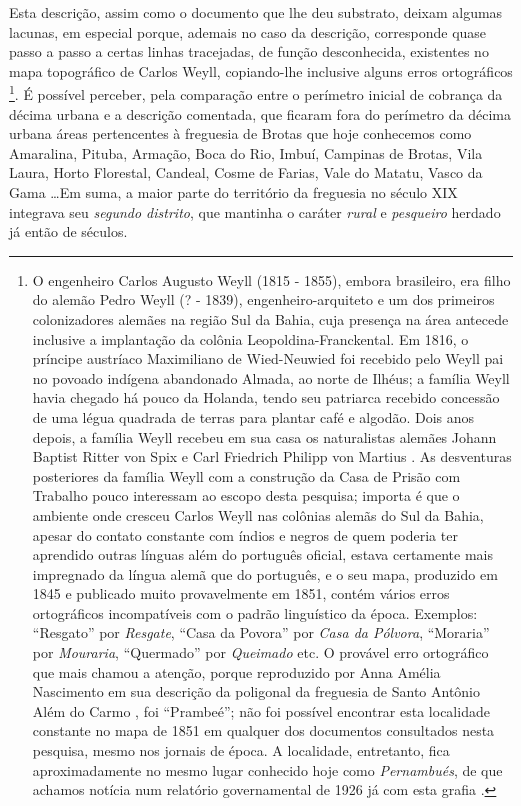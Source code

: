 Esta descrição, assim como o documento que lhe deu substrato, deixam algumas lacunas, em especial porque, ademais no caso da descrição, corresponde quase passo a passo a certas linhas tracejadas, de função desconhecida, existentes no mapa topográfico de Carlos Weyll, copiando-lhe inclusive alguns erros ortográficos \cite{weyll_mappa_1851}\footnote{O engenheiro Carlos Augusto Weyll (1815 - 1855), embora brasileiro, era filho do alemão Pedro Weyll (? - 1839), engenheiro-arquiteto e um dos primeiros colonizadores alemães na região Sul da Bahia, cuja presença na área antecede inclusive a implantação da colônia Leopoldina-Franckental. Em 1816, o príncipe austríaco Maximiliano de Wied-Neuwied foi recebido pelo Weyll pai no povoado indígena abandonado Almada, ao norte de Ilhéus; a família Weyll havia chegado há pouco da Holanda, tendo seu patriarca recebido concessão de uma légua quadrada de terras para plantar café e algodão. Dois anos depois, a família Weyll recebeu em sua casa os naturalistas alemães Johann Baptist Ritter von Spix e Carl Friedrich Philipp von Martius \cite[pp.~458-460]{oberacker_leopoldina_1972}. As desventuras posteriores da família Weyll com a construção da Casa de Prisão com Trabalho pouco interessam ao escopo desta pesquisa; importa é que o ambiente onde cresceu Carlos Weyll nas colônias alemãs do Sul da Bahia, apesar do contato constante com índios e negros de quem poderia ter aprendido outras línguas além do português oficial, estava certamente mais impregnado da língua alemã que do português, e o seu mapa, produzido em 1845 \cite[p.~31]{bahia_rpe_1846} e publicado muito provavelmente em 1851, contém vários erros ortográficos incompatíveis com o padrão linguístico da época. Exemplos: ``Resgato'' por \textit{Resgate}, ``Casa da Povora'' por \textit{Casa da Pólvora}, ``Moraria'' por \textit{Mouraria}, ``Quermado'' por \textit{Queimado} etc. O provável erro ortográfico que mais chamou a atenção, porque reproduzido por Anna Amélia Nascimento em sua descrição da poligonal da freguesia de Santo Antônio Além do Carmo \cite[p.~55]{NASCIMENTO2007}, foi ``Prambeé''; não foi possível encontrar esta localidade constante no mapa de 1851 em qualquer dos documentos consultados nesta pesquisa, mesmo nos jornais de época. A localidade, entretanto, fica aproximadamente no mesmo lugar conhecido hoje como \textit{Pernambués}, de que achamos notícia num relatório governamental de 1926 já com esta grafia \cite[p.~185]{bahia_rpe_1926}.}. É possível perceber, pela comparação entre o perímetro inicial de cobrança da décima urbana e a descrição comentada, que ficaram fora do perímetro da décima urbana áreas pertencentes à freguesia de Brotas que hoje conhecemos como Amaralina, Pituba, Armação, Boca do Rio, Imbuí, Campinas de Brotas, Vila Laura, Horto Florestal, Candeal, Cosme de Farias, Vale do Matatu, Vasco da Gama \dots Em suma, a maior parte do território da freguesia no século XIX integrava seu \textit{segundo distrito}, que mantinha o caráter \textit{rural} e \textit{pesqueiro} herdado já então de séculos.


